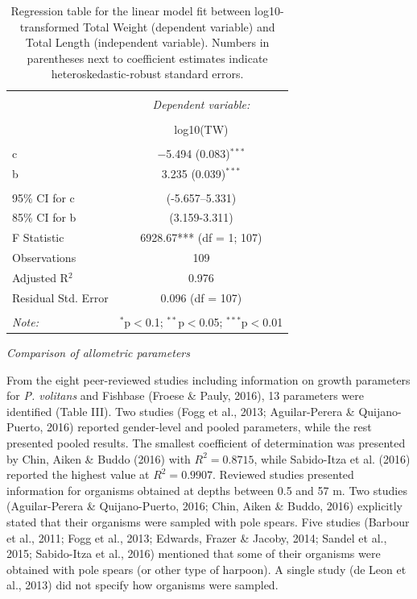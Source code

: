 \documentclass[12pt,]{article}
\begin{document}
\begin{table}[!htbp] \centering 
  \caption{Regression table for the linear model fit between log10-transformed Total Weight (dependent variable) and Total Length (independent variable). Numbers in parentheses next to coefficient estimates indicate heteroskedastic-robust standard errors.} 
  \label{} 
\begin{tabular}{@{\extracolsep{5pt}}lc} 
\\[-1.8ex]\hline 
\hline \\[-1.8ex] 
 & \multicolumn{1}{c}{\textit{Dependent variable:}} \\ 
\cline{2-2} 
\\[-1.8ex] & log10(TW) \\ 
\hline \\[-1.8ex] 
 c & $-$5.494 (0.083)$^{***}$ \\ 
  b & 3.235 (0.039)$^{***}$ \\ 
 \hline \\[-1.8ex] 
95\% CI for c & (-5.657--5.331) \\ 
85\% CI for b & (3.159-3.311) \\ 
F Statistic & 6928.67*** (df = 1; 107) \\ 
Observations & 109 \\ 
Adjusted R$^{2}$ & 0.976 \\ 
Residual Std. Error & 0.096 (df = 107) \\ 
\hline 
\hline \\[-1.8ex] 
\textit{Note:}  & \multicolumn{1}{r}{$^{*}$p$<$0.1; $^{**}$p$<$0.05; $^{***}$p$<$0.01} \\ 
\end{tabular} 
\end{table}

\emph{Comparison of allometric parameters}

From the eight peer-reviewed studies including information on growth
parameters for \emph{P. volitans} and Fishbase (Froese \& Pauly, 2016),
13 parameters were identified (Table III). Two studies (Fogg et al.,
2013; Aguilar-Perera \& Quijano-Puerto, 2016) reported gender-level and
pooled parameters, while the rest presented pooled results. The smallest
coefficient of determination was presented by Chin, Aiken \& Buddo
(2016) with \(R^2 = 0.8715\), while Sabido-Itza et al. (2016) reported
the highest value at \(R^2 = 0.9907\). Reviewed studies presented
information for organisms obtained at depths between 0.5 and 57 m. Two
studies (Aguilar-Perera \& Quijano-Puerto, 2016; Chin, Aiken \& Buddo,
2016) explicitly stated that their organisms were sampled with pole
spears. Five studies (Barbour et al., 2011; Fogg et al., 2013; Edwards,
Frazer \& Jacoby, 2014; Sandel et al., 2015; Sabido-Itza et al., 2016)
mentioned that some of their organisms were obtained with pole spears
(or other type of harpoon). A single study (de Leon et al., 2013) did
not specify how organisms were sampled.
\end{document}
